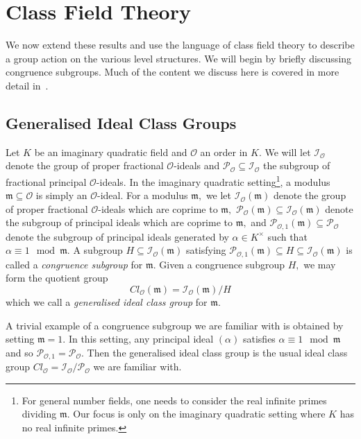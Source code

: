 \documentclass[11pt,a4paper]{amsart}
\theoremstyle{plain}
\theoremstyle{definition}
\theoremstyle{remark}
\begin{document}
\section{Class Field Theory}\label{sec:class-field-theory}
We now extend these results and use the language of class field theory to describe a group action on the various level structures.  We will begin by briefly discussing congruence subgroups. Much of the content we discuss here is covered in more detail in~\cite{cox}.

\subsection{Generalised Ideal Class Groups}
Let $K$ be an imaginary quadratic field and $\mathcal{O}$ an order in $K.$ We will let $\mathcal{I}_{\mathcal{O}}$ denote the group of proper fractional $\mathcal{O}$-ideals and $\mathcal{P}_{\mathcal{O}} \subseteq \mathcal{I}_{\mathcal{O}}$ the subgroup of fractional principal $\mathcal{O}$-ideals. In the imaginary quadratic setting\footnote{For general number fields, one needs to consider the real infinite primes dividing $\mathfrak{m}.$ Our focus is only on the imaginary quadratic setting where $K$ has no real infinite primes.}, a modulus $\mathfrak{m} \subseteq \mathcal{O}$ is simply an $\mathcal{O}$-ideal. For a modulus $\mathfrak{m},$ we let $\mathcal{I}_{\mathcal{O}}(\mathfrak{m})$ denote the group of proper fractional $\mathcal{O}$-ideals which are coprime to $\mathfrak{m},$ $\mathcal{P}_{\mathcal{O}}(\mathfrak{m}) \subseteq \mathcal{I}_{\mathcal{O}}(\mathfrak{m})$ denote the subgroup of principal ideals which are coprime to $\mathfrak{m},$ and $\mathcal{P}_{\mathcal{O},1}(\mathfrak{m}) \subseteq \mathcal{P}_{\mathcal{O}}$ denote the subgroup of principal ideals generated by $\alpha \in K^{\times}$ such that $\alpha \equiv 1 \mod \mathfrak{m}.$ A subgroup $H \subseteq \mathcal{I}_{\mathcal{O}}(\mathfrak{m})$ satisfying $\mathcal{P}_{\mathcal{O},1}(\mathfrak{m}) \subseteq H \subseteq \mathcal{I}_{\mathcal{O}}(\mathfrak{m})$ is called a \emph{congruence subgroup} for $\mathfrak{m}.$ Given a congruence subgroup $H,$ we may form the quotient group
\[
  Cl_{\mathcal{O}}(\mathfrak{m}) = \mathcal{I}_{\mathcal{O}}(\mathfrak{m}) / H
\]
which we call a \emph{generalised ideal class group} for $\mathfrak{m}.$

A trivial example of a congruence subgroup we are familiar with is obtained by setting $\mathfrak{m} = 1.$ In this setting, any principal ideal $(\alpha)$ satisfies $\alpha \equiv 1 \mod \mathfrak{m}$ and so $\mathcal{P}_{\mathcal{O},1} = \mathcal{P}_{\mathcal{O}}.$ Then the generalised ideal class group is the usual ideal class group $Cl_{\mathcal{O}} = \mathcal{I}_{\mathcal{O}}/\mathcal{P}_{\mathcal{O}}$ we are familiar with.
\end{document}
